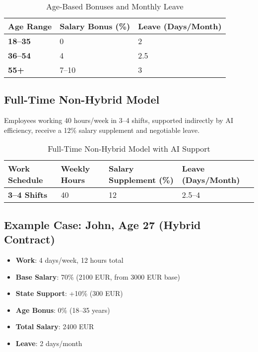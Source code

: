 \documentclass[12pt]{article}
\begin{document}
\begin{table}[!htbp]
\centering
\begin{tabular}{|>{\bfseries}p{3cm}|p{3cm}|p{3cm}|}
\hline
Age Range & Salary Bonus (\%) & Leave (Days/Month) \\
\hline
18--35 & 0 & 2 \\
36--54 & 4 & 2.5 \\
55+ & 7--10 & 3 \\
\hline
\end{tabular}
\caption{Age-Based Bonuses and Monthly Leave}
\end{table}

\subsection{Full-Time Non-Hybrid Model}
Employees working 40 hours/week in 3--4 shifts, supported indirectly by AI efficiency, receive a 12\% salary supplement and negotiable leave.

\begin{table}[!htbp]
\centering
\begin{tabular}{|>{\bfseries}p{3cm}|p{3cm}|p{3cm}|p{3cm}|}
\hline
Work Schedule & Weekly Hours & Salary Supplement (\%) & Leave (Days/Month) \\
\hline
3--4 Shifts & 40 & 12 & 2.5--4 \\
\hline
\end{tabular}
\caption{Full-Time Non-Hybrid Model with AI Support}
\end{table}

\subsection{Example Case: John, Age 27 (Hybrid Contract)}
\begin{itemize}
  \item \textbf{Work}: 4 days/week, 12 hours total
  \item \textbf{Base Salary}: 70\% (2100 EUR, from 3000 EUR base)
  \item \textbf{State Support}: +10\% (300 EUR)
  \item \textbf{Age Bonus}: 0\% (18--35 years)
  \item \textbf{Total Salary}: 2400 EUR
  \item \textbf{Leave}: 2 days/month
\end{itemize}
\end{document}
